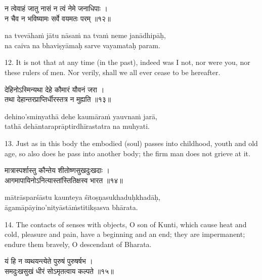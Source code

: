 \begin{gitaverse}
न त्वेवाहं जातु नासं न त्वं नेमे जनाधिपाः । \\
न चैव न भविष्यामः सर्वे वयमतः परम् ॥१२॥
\end{gitaverse}

\begin{transliteration}
na tvevāhaṁ jātu nāsaṁ na tvaṁ neme janādhipāḥ, \\
na caiva na bhaviṣyāmaḥ sarve vayamataḥ param.
\end{transliteration}

12. It is not that at any time (in the past), indeed was I not, nor were you,
nor these rulers of men. Nor verily, shall we all ever cease to be hereafter.

\begin{gitaverse}
देहिनोऽस्मिन्यथा देहे कौमारं यौवनं जरा । \\
तथा देहान्तरप्राप्तिर्धीरस्तत्र न मुह्यति ॥१३॥
\end{gitaverse}

\begin{transliteration}
dehino'sminyathā dehe kaumāraṁ yauvnaṁ jarā, \\
tathā dehāntaraprāptirdhīrastatra na muhyati.
\end{transliteration}

13. Just as in this body the embodied (soul) passes into childhood, youth and
old age, so also does he pass into another body; the firm man does not grieve
at it.

\begin{gitaverse}
मात्रास्पर्शास्तु कौन्तेय शीतोष्णसुखदुःखदाः । \\
आगमापायिनोऽनित्यास्तांस्तितिक्षस्व भारत ॥१४॥
\end{gitaverse}

\begin{transliteration}
mātrāsparśāstu kaunteya śītoṣṇasukhaduḥkhadāḥ, \\
āgamāpāyino'nityāstāṁstitikṣasva bhārata.
\end{transliteration}

14. The contacts of senses with objects, O son of Kunti, which cause heat and
cold, pleasure and pain, have a beginning and an end; they are impermanent;
endure them bravely, O descendant of Bharata.

\begin{gitaverse}
यं हि न व्यथयन्त्येते पुरुषं पुरुषर्षभ । \\
समदुःखसुखं धीरं सोऽमृतत्वाय कल्पते ॥१५॥
\end{gitaverse}

